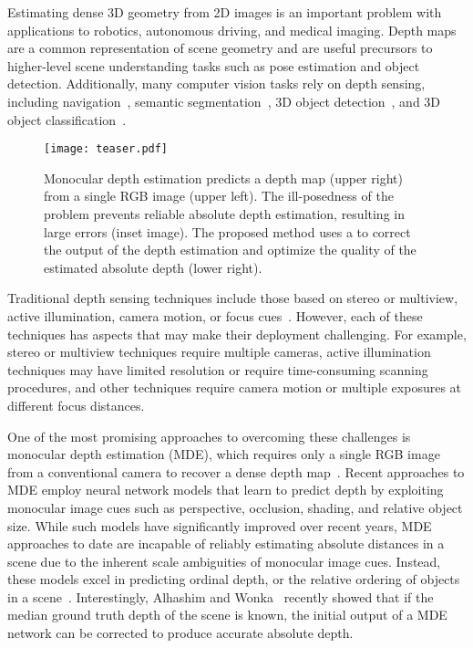Estimating dense 3D geometry from 2D images is an important problem with
applications to robotics, autonomous driving, and medical imaging. Depth maps
are a common representation of scene geometry and are useful precursors to
higher-level scene understanding tasks such as pose estimation and object
detection. Additionally, many computer vision tasks rely on depth sensing,
including navigation~\cite{geiger2013vision}, semantic
segmentation~\cite{gupta2013perceptual,ren2012rgb,silberman2012indoor}, 3D
object
detection~\cite{gupta2014learning,lin2013holistic,shrivastava2013building,song2014sliding,song2016deep},
and 3D object
classification~\cite{maturana2015voxnet,qi2016volumetric,wu20153d}.

\begin{figure}[t]
  \centering
  \texttt{[image: teaser.pdf]}
  \caption{Monocular depth estimation predicts a depth map (upper right) from a
    single RGB image (upper left). The ill-posedness of the problem prevents
    reliable absolute depth estimation, resulting in large errors (inset image).
    The proposed method uses a  to correct the output of the depth estimation and optimize the quality of the
    estimated absolute depth (lower right).}
  \label{fig:teaser}
\end{figure}

Traditional depth sensing techniques include those based on stereo or multiview,
active illumination, camera motion, or focus cues~\cite{szeliski2010computer}.
However, each of these techniques has aspects that may make their deployment
challenging. For example, stereo or multiview techniques require multiple
cameras, active illumination techniques may have limited resolution or require
time-consuming scanning procedures, and other techniques require camera motion
or multiple exposures at different focus distances.


One of the most promising approaches to overcoming these challenges is monocular
depth estimation (MDE), which requires only a single RGB image from a
conventional camera to recover a dense depth
map~\cite{Alhashim2018,Eigen2014,Fu2018,Laina2016,Saxena2006}. Recent approaches
to MDE employ neural network models that learn to predict depth by exploiting
monocular image cues such as perspective, occlusion, shading, and relative
object size. While such models have significantly improved over recent years,
MDE approaches to date are incapable of reliably estimating absolute distances
in a scene due to the inherent scale ambiguities of monocular image cues.
Instead, these models excel in predicting ordinal depth, or the relative
ordering of objects in a scene~\cite{Eigen2014,Fu2018}. Interestingly, Alhashim
and Wonka~\cite{Alhashim2018} recently showed that if the median ground truth
depth of the scene is known, the initial output of a MDE network can be
corrected to produce accurate absolute depth.


